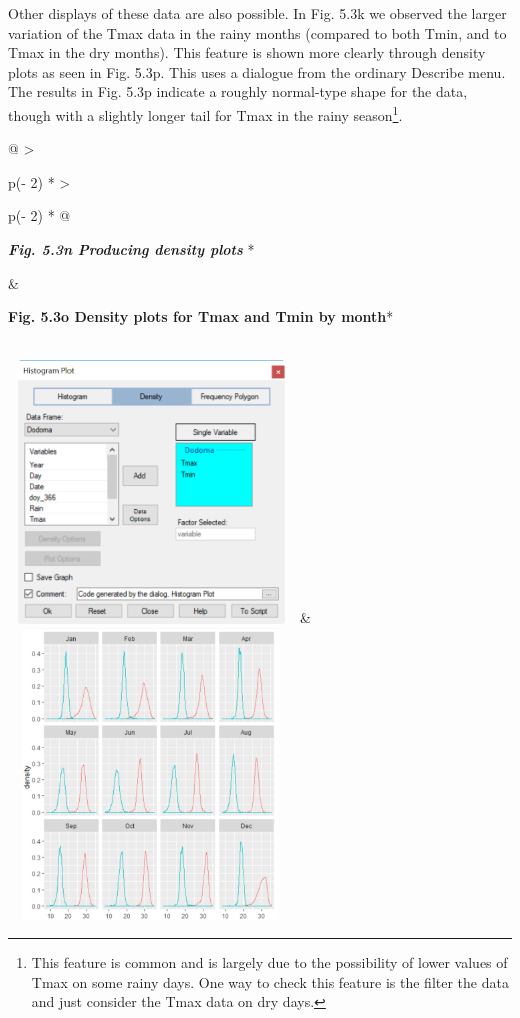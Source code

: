 \documentclass[
  letterpaper,
  DIV=11,
  numbers=noendperiod]{scrreprt}
\begin{document}
Other displays of these data are also possible. In Fig. 5.3k we observed
the larger variation of the Tmax data in the rainy months (compared to
both Tmin, and to Tmax in the dry months). This feature is shown more
clearly through density plots as seen in Fig. 5.3p. This uses a dialogue
from the ordinary Describe menu. The results in Fig. 5.3p indicate a
roughly normal-type shape for the data, though with a slightly longer
tail for Tmax in the rainy season\footnote{This feature is common and is
  largely due to the possibility of lower values of Tmax on some rainy
  days. One way to check this feature is the filter the data and just
  consider the Tmax data on dry days.}.

\begin{longtable}[]{@{}
  >{\raggedright\arraybackslash}p{(\columnwidth - 2\tabcolsep) * }
  >{\raggedright\arraybackslash}p{(\columnwidth - 2\tabcolsep) * }@{}}
\toprule\noalign{}
\begin{minipage}[b]{\linewidth}\raggedright
\textbf{\emph{Fig. 5.3n Producing density plots}} *
\end{minipage} & \begin{minipage}[b]{\linewidth}\raggedright
\textbf{Fig. 5.3o Density plots for Tmax and Tmin by month}*
\end{minipage} \\
\midrule\noalign{}
\endhead
\bottomrule\noalign{}
\endlastfoot
\includegraphics[width=2.99244in,height=2.74434in]{figures/Fig5.3n.png}
&
\includegraphics[width=2.97089in,height=3.03358in]{figures/Fig5.3o.png} \\
\end{longtable}
\end{document}
